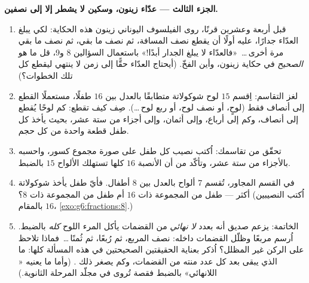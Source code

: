 \begin{problem}
\medskip
\noindent\textbf{الجزء الثالث --- عدّاء زينون، وسكين
لا يشطر إلا إلى نصفين.}
\begin{enumerate}[resume]
  \item قبل أربعة وعشرين قرنًا، روى الفيلسوف اليوناني زينون
        هذه الحكاية: لكي يبلغ العدّاء جدارًا، عليه أولًا أن
        يقطع نصف المسافة، ثم نصف ما بقي، ثم
        نصف ما بقي مرة أخرى\,\dots\ «فالعدّاء لا يبلغ
        الجدار أبدًا!» باستعمال السؤالين 8 و9، قل ما هو
        \emph{الصحيح} في حكاية زينون، وأين الفخّ.
        (أيحتاج العدّاء حقًّا إلى زمن لا ينتهي ليقطع كل تلك
        الخطوات؟)
  \item لغز التقاسم: اِقسم $15$ لوح شوكولاتة متطابقًا
        بالعدل بين $16$ طفلًا، مستعملًا القطع إلى أنصاف فقط
        (لوحٍ، أو نصف لوح، أو ربع لوح\,\dots).
        صِف كيف تقطع: كم لوحًا يُقطع إلى أنصاف،
        وكم إلى أرباع، وإلى أثمان، وإلى أجزاء من ستة عشر،
        بحيث يأخذ كل طفل قطعة واحدة من كل حجم.
  \item تحقّق من تقاسمك: اُكتب نصيب كل طفل على صورة مجموع
        كسور، واحسبه بالأجزاء من ستة عشر، وتأكّد من أن
        الأنصبة $16$ كلها تستهلك الألواح $15$ بالضبط.
  \item في القسم المجاور، تُقسم $7$ ألواح بالعدل بين
        $8$ أطفال. فأيّ طفل يأخذ شوكولاتة أكثر --- طفل
        من المجموعة ذات $16$ أم طفل من المجموعة ذات $8$؟ (اُكتب
        النصيبين بالمقام $16$، \cref{exo:g6:fractions:8}.)
  \item الخاتمة: يزعم صديق أنه بعدد \emph{لا نهائي}
        من القضمات يأكل المرء اللوح \emph{كله} بالضبط.
        اُرسم مربعًا وظلّل القضمات داخله: نصف
        المربع، ثم رُبعًا، ثم ثُمنًا\,\dots\ فماذا
        تلاحظ على الركن غير المظلل؟ اُذكر بعناية
        الحقيقتين الصحيحتين في هذه المسألة كلها: ما الذي يبقى
        بعد كل عدد منته من القضمات، وكم يصغر ذلك
        . (وأما ما يعنيه « اللانهائي» بالضبط
        فقصة تُروى في مجلّد المرحلة الثانوية.)
\end{enumerate}
\end{problem}
